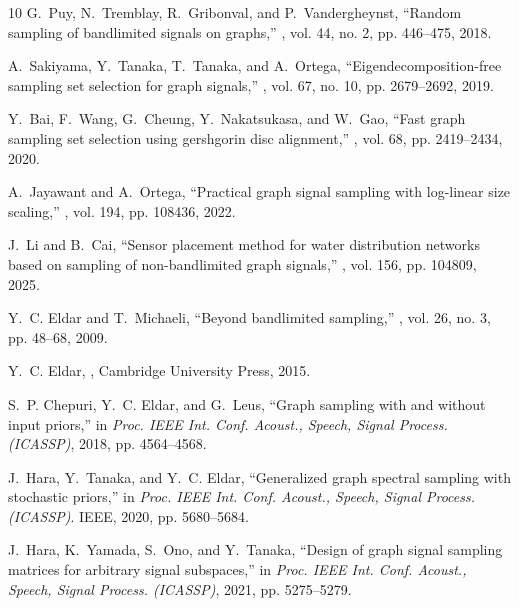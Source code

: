 \documentclass[journal]{IEEEtran}
\begin{document}
\begin{thebibliography}{10}
    G.~Puy, N.~Tremblay, R.~Gribonval, and P.~Vandergheynst,
    \newblock ``Random sampling of bandlimited signals on graphs,''
    , vol. 44, no. 2, pp. 446--475, 2018.
    
    A.~Sakiyama, Y.~Tanaka, T.~Tanaka, and A.~Ortega,
    \newblock ``Eigendecomposition-free sampling set selection for graph signals,''
    , vol. 67, no. 10, pp. 2679--2692, 2019.
    
    Y.~Bai, F.~Wang, G.~Cheung, Y.~Nakatsukasa, and W.~Gao,
    \newblock ``Fast graph sampling set selection using gershgorin disc alignment,''
    , vol. 68, pp. 2419--2434, 2020.
    
    A.~Jayawant and A.~Ortega,
    \newblock ``Practical graph signal sampling with log-linear size scaling,''
    , vol. 194, pp. 108436, 2022.
    
    J.~Li and B.~Cai,
    \newblock ``Sensor placement method for water distribution networks based on sampling of non-bandlimited graph signals,''
    , vol. 156, pp. 104809, 2025.
    
    Y.~C. Eldar and T.~Michaeli,
    \newblock ``Beyond bandlimited sampling,''
    , vol. 26, no. 3, pp. 48--68, 2009.
    
    Y.~C. Eldar,
    ,
    \newblock Cambridge University Press, 2015.
    
    S.~P. Chepuri, Y.~C. Eldar, and G.~Leus,
    \newblock ``Graph sampling with and without input priors,''
    \newblock in {\em Proc. IEEE Int. Conf. Acoust., Speech, Signal Process. (ICASSP)}, 2018, pp. 4564--4568.
    
    J.~Hara, Y.~Tanaka, and Y.~C. Eldar,
    \newblock ``Generalized graph spectral sampling with stochastic priors,''
    \newblock in {\em Proc. IEEE Int. Conf. Acoust., Speech, Signal Process. (ICASSP)}. IEEE, 2020, pp. 5680--5684.
    
    J.~Hara, K.~Yamada, S.~Ono, and Y.~Tanaka,
    \newblock ``Design of graph signal sampling matrices for arbitrary signal subspaces,''
    \newblock in {\em Proc. IEEE Int. Conf. Acoust., Speech, Signal Process. (ICASSP)}, 2021, pp. 5275--5279.
    

\end{thebibliography}
\end{document}
